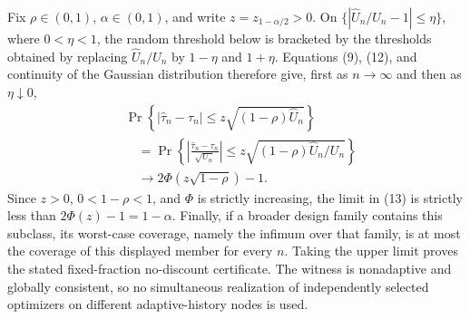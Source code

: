 Fix \(\rho\in(0,1)\), \(\alpha\in(0,1)\), and write \(z=z_{1-\alpha/2}>0\).  On \(\{|\widehat U_n/U_n-1|\le\eta\}\), where \(0<\eta<1\), the random threshold below is bracketed by the thresholds obtained by replacing \(\widehat U_n/U_n\) by \(1-\eta\) and \(1+\eta\).  Equations (9), (12), and continuity of the Gaussian distribution therefore give, first as \(n\to\infty\) and then as \(\eta\downarrow0\),
\[
\begin{aligned}
&\Pr\!\left\{|\widehat\tau_n-\tau_n|
\le z\sqrt{(1-\rho)\widehat U_n}\right\}\\
&\quad=\Pr\!\left\{
\left|\frac{\widehat\tau_n-\tau_n}{\sqrt{U_n}}\right|
\le z\sqrt{(1-\rho)\widehat U_n/U_n}\right\}\\
&\quad\longrightarrow2\Phi\!\left(z\sqrt{1-\rho}\right)-1.
\end{aligned}
\tag{13}
\]
Since \(z>0\), \(0<1-\rho<1\), and \(\Phi\) is strictly increasing, the limit in (13) is strictly less than \(2\Phi(z)-1=1-\alpha\).  Finally, if a broader design family contains this subclass, its worst-case coverage, namely the infimum over that family, is at most the coverage of this displayed member for every \(n\).  Taking the upper limit proves the stated fixed-fraction no-discount certificate.  The witness is nonadaptive and globally consistent, so no simultaneous realization of independently selected optimizers on different adaptive-history nodes is used.
